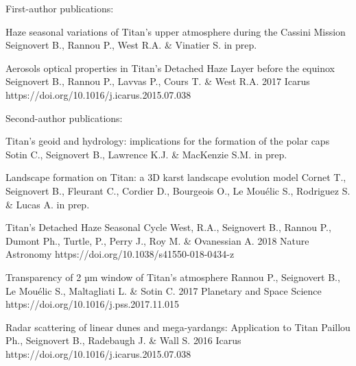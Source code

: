 
\begin{cvpublications}{First-author publications:}

	{Haze seasonal variations of Titan's upper atmosphere during the Cassini Mission}
	{Seignovert B., Rannou P., West R.A. \& Vinatier S.}
	{in prep.}
    {}
    {}

	{Aerosols optical properties in Titan's Detached Haze Layer before the equinox}
	{Seignovert B., Rannou P., Lavvas P., Cours T. \& West R.A.}
	{2017}
	{Icarus}
	{https://doi.org/10.1016/j.icarus.2015.07.038}

\end{cvpublications}

\begin{cvpublications}{Second-author publications:}

	{Titan’s geoid and hydrology: implications for the formation of the polar caps}
	{Sotin C., Seignovert B., Lawrence K.J. \& MacKenzie S.M.}
	{in prep.}
    {}
    {}

	{Landscape formation on Titan: a 3D karst landscape evolution model}
	{Cornet T., Seignovert B., Fleurant C., Cordier D., Bourgeois O., Le Mouélic S., Rodriguez S. \& Lucas A.}
	{in prep.}
    {}
    {}

	{Titan's Detached Haze Seasonal Cycle}
	{West, R.A., Seignovert B., Rannou P., Dumont Ph., Turtle,  P., Perry J., Roy M. \& Ovanessian A.}
	{2018}
    {Nature Astronomy}
    {https://doi.org/10.1038/s41550-018-0434-z}

	{Transparency of 2 µm window of Titan’s atmosphere}
	{Rannou P., Seignovert B., Le Mouélic S., Maltagliati L. \& Sotin C.}
	{2017}
	{Planetary and Space Science}
	{https://doi.org/10.1016/j.pss.2017.11.015}

	{Radar scattering of linear dunes and mega-yardangs: Application to Titan}
	{Paillou Ph., Seignovert B., Radebaugh J. \& Wall S.}
	{2016}
	{Icarus}
	{https://doi.org/10.1016/j.icarus.2015.07.038}

\end{cvpublications}

